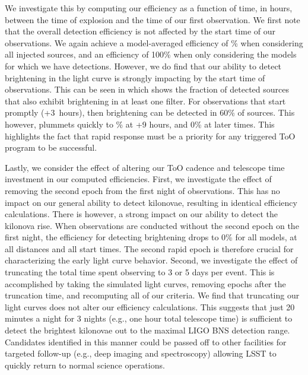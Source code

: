 We investigate this by computing our efficiency as a function of time, in hours, between the time of explosion and the time of our first observation. We first note that the overall detection efficiency is not affected by the start time of our observations. We again achieve a model-averaged efficiency of \% when considering all injected sources, and an efficiency of 100\% when only considering the models for which we have detections. However, we do find that our ability to detect brightening in the light curve is strongly impacting by the start time of observations. This can be seen in  which shows the fraction of detected sources that also exhibit brightening in at least one filter. For observations that start promptly (+3~hours), then brightening can be detected in 60\% of sources. This however, plummets quickly to \% at +9 hours, and 0\% at later times. This highlights the fact that rapid response must be a priority for any triggered ToO program to be successful.


Lastly, we consider the effect of altering our ToO cadence and telescope time investment in our computed efficiencies. First, we investigate the effect of removing the second epoch from the first night of observations. This has no impact on our general ability to detect kilonovae, resulting in identical efficiency calculations. There is however, a strong impact on our ability to detect the kilonova rise. When observations are conducted without the second epoch on the first night, the efficiency for detecting brightening drops to 0\% for all models, at all distances and all start times. The second rapid epoch is therefore crucial for characterizing the early light curve behavior. Second, we investigate the effect of truncating the total time spent observing to 3 or 5 days per event. This is accomplished by taking the simulated light curves, removing epochs after the truncation time, and recomputing all of our criteria. We find that truncating our light curves does not alter our efficiency calculations. This suggests that just 20 minutes a night for 3 nights (e.g., one hour total telescope time) is sufficient to detect the brightest kilonovae out to the maximal LIGO BNS detection range. Candidates identified in this manner could be passed off to other facilities for targeted follow-up (e.g., deep imaging and spectroscopy) allowing LSST to quickly return to normal science operations.

